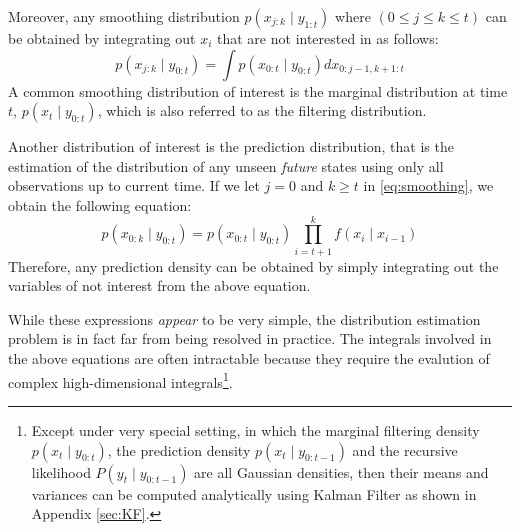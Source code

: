 Moreover, any smoothing distribution $p(x_{j:k} \mid y_{1:t})$ where $(0 \leq j \leq k\leq t)$ can be obtained by integrating out $x_i$ that are not interested in as follows:
\begin{equation}
  p(x_{j:k} \mid y_{0:t}) = \int p(x_{0:t} \mid y_{0:t}) dx_{0:j-1, k+1:t}
\label{eq:smoothing}
\end{equation}
A common smoothing distribution of interest is the marginal distribution at time $t$, $p(x_t \mid y_{0:t})$, which is also referred to as the filtering distribution.

Another distribution of interest is  the prediction distribution, that is the estimation of the distribution of any unseen \emph{future} states using only all observations up to current time. If we let $j = 0$ and $k \geq t$ in \eqref{eq:smoothing}, we obtain the following equation:
\begin{equation}
  p(x_{0:k} \mid y_{0:t}) = p(x_{0:t} \mid y_{0:t}) \prod^k_{i=t+1} f(x_i \mid x_{i-1})
\end{equation}
Therefore, any prediction density can be obtained by simply integrating out the variables of not interest from the above equation.

While these expressions \emph{appear} to be very simple, the distribution estimation problem is in fact far from being resolved in practice. The integrals involved in the above equations are often intractable because they require the evalution of complex high-dimensional integrals\footnote{Except under very special setting, in which the marginal filtering density $p(x_t \mid y_{0:t})$, the prediction density $p(x_t \mid y_{0:t-1})$ and the recursive likelihood $P(y_t \mid y_{0:t-1})$ are all Gaussian densities, then their means and variances can be computed analytically using Kalman Filter as shown in Appendix \ref{sec:KF}.}. 

